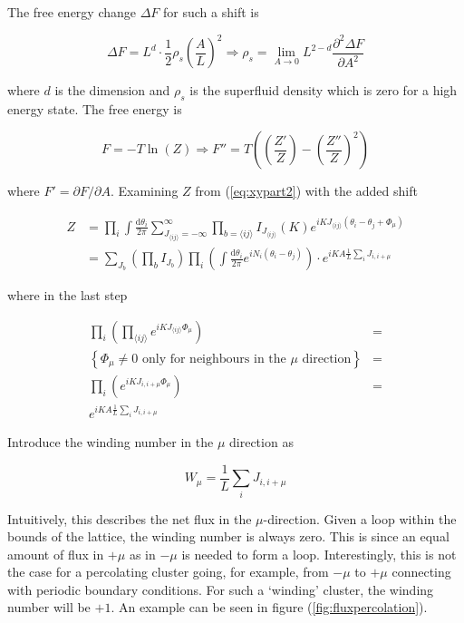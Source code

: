 The free energy change $\Delta F$ for such a shift is

\begin{equation}
    \Delta F = L^d \cdot \frac{1}{2} \rho_s \left( \frac{A}{L} \right)^2 \Rightarrow \rho_s = \lim_{A \to 0} L^{2 - d}\frac{\partial^2 \Delta F}{\partial A^2}
\end{equation}

where $d$ is the dimension and $\rho_s$ is the superfluid density which is zero for a high energy state. The free energy is

\begin{equation}
F = - T \ln(Z) \Rightarrow F'' = T \left(\left(\frac{Z'}{Z}\right) - \left( \frac{Z''}{Z} \right)^2 \right)
\label{eq:xyfreeenergy}
\end{equation}

where $F' = \partial F / \partial A$. Examining $Z$ from (\ref{eq:xypart2}) with the added shift

\begin{align}
    Z &= \prod_i \int \frac{\mathrm d \theta_i}{2 \pi} \sum_{J_{\langle ij \rangle} = -\infty}^{\infty} \prod_{b = \langle ij \rangle} I_{J_{\langle ij \rangle}} ( K ) e^{iK J_{\langle ij \rangle} (\theta_i - \theta_j + \Phi_\mu)} \\
%
    &= \sum_{J_b} \left ( \prod_b I_{J_b} \right ) \prod_i \left ( \int \frac{\mathrm d \theta_i}{2 \pi} e^{i N_i (\theta_i - \theta_j)} \right ) \cdot e^{i K A \frac{1}{L} \sum_i J_{i, i+\mu}}
\label{eq:xypart3}
\end{align}

where in the last step

\begin{align}
    \prod_i \left (\prod_{\langle ij \rangle} e^{iK J_{\langle ij \rangle} \Phi_\mu} \right) &= \\
%
    \left\{ \text{$\Phi_\mu \neq 0$ only for neighbours in the $\mu$ direction} \right \} &= \\
%
    \prod_i \left ( e^{iK J_{i, i+\mu} \Phi_\mu} \right ) &= \\
%
    e^{iKA \frac{1}{L} \sum_i J_{i, i+\mu}}
\end{align}

Introduce the winding number in the $\mu$ direction as

\begin{equation}
    W_\mu = \frac{1}{L} \sum_i J_{i, i+\mu}
\label{eq:defwinding}
\end{equation}

Intuitively, this describes the net flux in the $\mu$-direction. Given a loop within the bounds of the lattice, the winding number is always zero. This is since an equal amount of flux in $+\mu$ as in $-\mu$ is needed to form a loop. Interestingly, this is not the case for a percolating cluster going, for example, from $-\mu$ to $+\mu$ connecting with periodic boundary conditions. For such a `winding' cluster, the winding number will be $+1$. An example can be seen in figure (\ref{fig:fluxpercolation}).

